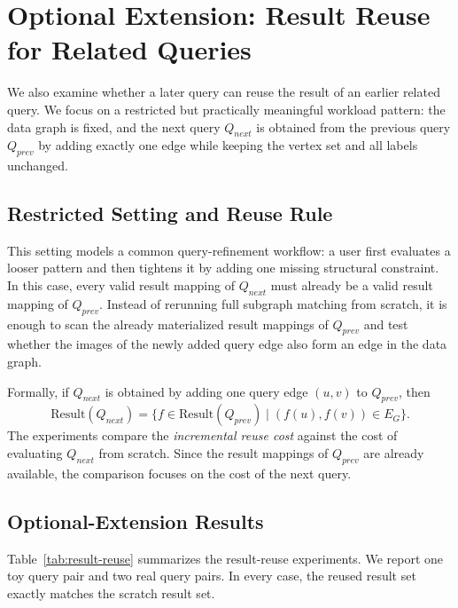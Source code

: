 \section{Optional Extension: Result Reuse for Related Queries}
\label{sec:optional-reuse}

We also examine whether a later query can reuse the result of an earlier related query. We focus on a restricted but practically meaningful workload pattern: the data graph is fixed, and the next query $Q_{next}$ is obtained from the previous query $Q_{prev}$ by adding exactly one edge while keeping the vertex set and all labels unchanged.

\subsection{Restricted Setting and Reuse Rule}

This setting models a common query-refinement workflow: a user first evaluates a looser pattern and then tightens it by adding one missing structural constraint. In this case, every valid result mapping of $Q_{next}$ must already be a valid result mapping of $Q_{prev}$. Instead of rerunning full subgraph matching from scratch, it is enough to scan the already materialized result mappings of $Q_{prev}$ and test whether the images of the newly added query edge also form an edge in the data graph.

Formally, if $Q_{next}$ is obtained by adding one query edge $(u,v)$ to $Q_{prev}$, then
\[
\mathrm{Result}(Q_{next}) = \{ f \in \mathrm{Result}(Q_{prev}) \mid (f(u), f(v)) \in E_G \}.
\]
The experiments compare the \emph{incremental reuse cost} against the cost of evaluating $Q_{next}$ from scratch. Since the result mappings of $Q_{prev}$ are already available, the comparison focuses on the cost of the next query.

\subsection{Optional-Extension Results}

Table~\ref{tab:result-reuse} summarizes the result-reuse experiments. We report one toy query pair and two real query pairs. In every case, the reused result set exactly matches the scratch result set.

